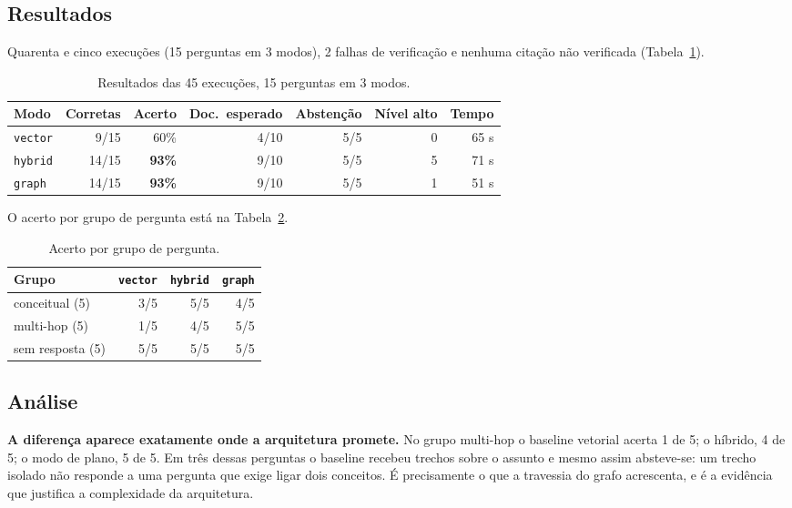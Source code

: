 \documentclass[12pt]{article}
\begin{document}
\subsection{Resultados}

Quarenta e cinco execuções (15 perguntas em 3 modos), 2 falhas de verificação e nenhuma citação
não verificada (Tabela~\ref{tab:resultados}).

\begin{table}[h]
\centering
\caption{Resultados das 45 execuções, 15 perguntas em 3 modos.}
\label{tab:resultados}
\small
\begin{tabular}{@{}lrrrrrr@{}}
\toprule
Modo & Corretas & Acerto & Doc.\ esperado & Abstenção & Nível alto & Tempo \\
\midrule
\texttt{vector} & 9/15 & 60\% & 4/10 & 5/5 & 0 & 65 s \\
\texttt{hybrid} & 14/15 & \textbf{93\%} & 9/10 & 5/5 & 5 & 71 s \\
\texttt{graph} & 14/15 & \textbf{93\%} & 9/10 & 5/5 & 1 & 51 s \\
\bottomrule
\end{tabular}
\end{table}

O acerto por grupo de pergunta está na Tabela~\ref{tab:grupos}.

\begin{table}[h]
\centering
\caption{Acerto por grupo de pergunta.}
\label{tab:grupos}
\small
\begin{tabular}{@{}lrrr@{}}
\toprule
Grupo & \texttt{vector} & \texttt{hybrid} & \texttt{graph} \\
\midrule
conceitual (5) & 3/5 & 5/5 & 4/5 \\
multi-hop (5) & 1/5 & 4/5 & 5/5 \\
sem resposta (5) & 5/5 & 5/5 & 5/5 \\
\bottomrule
\end{tabular}
\end{table}

\subsection{Análise}

\textbf{A diferença aparece exatamente onde a arquitetura promete.} No grupo multi-hop o baseline
vetorial acerta 1 de 5; o híbrido, 4 de 5; o modo de plano, 5 de 5. Em três dessas perguntas o
baseline recebeu trechos sobre o assunto e mesmo assim absteve-se: um trecho isolado não responde
a uma pergunta que exige ligar dois conceitos. É precisamente o que a travessia do grafo
acrescenta, e é a evidência que justifica a complexidade da arquitetura.
\end{document}
